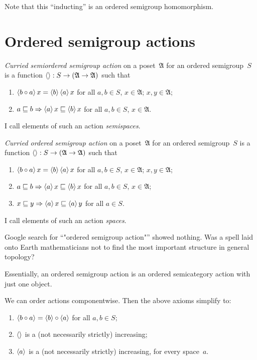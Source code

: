 Note that this ``inducting'' is an ordered semigroup homomorphism.

\chapter{Ordered semigroup actions}

\begin{defn}
\emph{Curried semiordered semigroup action} on a poset~$\mathfrak{A}$ for an ordered semigroup~$S$ is a function $\left\langle \right\rangle:S\to(\mathfrak{A}\to\mathfrak{A})$ such that
\begin{enumerate}
\item $\left\langle b\circ a\right\rangle x = \left\langle b\right\rangle\left\langle a\right\rangle x$ for all $a,b\in S$, $x\in\mathfrak{A}$;
$x,y\in\mathfrak{A}$;
\item $a\sqsubseteq b\Rightarrow\left\langle a\right\rangle x\sqsubseteq \left\langle b\right\rangle x$ for all $a,b\in S$, $x\in\mathfrak{A}$.
\end{enumerate}
I call elements of such an action \emph{semispaces}.
\end{defn}

\begin{defn}
\emph{Curried ordered semigroup action} on a poset~$\mathfrak{A}$ for an ordered semigroup~$S$ is a function $\left\langle \right\rangle:S\to(\mathfrak{A}\to\mathfrak{A})$ such that
\begin{enumerate}
\item $\left\langle b\circ a\right\rangle x = \left\langle b\right\rangle\left\langle a\right\rangle x$ for all $a,b\in S$, $x\in\mathfrak{A}$;
$x,y\in\mathfrak{A}$;
\item $a\sqsubseteq b\Rightarrow\left\langle a\right\rangle x\sqsubseteq \left\langle b\right\rangle x$ for all $a,b\in S$, $x\in\mathfrak{A}$;
\item $x\sqsubseteq y\Rightarrow\left\langle a\right\rangle x\sqsubseteq \left\langle a\right\rangle y$ for all $a\in S$.
\end{enumerate}
I call elements of such an action \emph{spaces}.
\end{defn}

\begin{rem}
Google search for ``"ordered semigroup action"'' showed nothing. Was a spell laid onto Earth mathematicians not to find the most important structure in general topology?
\end{rem}

Essentially, an ordered semigroup action is an ordered semicategory action with just one object.

We can order actions componentwise. Then the above axioms simplify to:
\begin{enumerate}
\item $\left\langle b\circ a\right\rangle = \left\langle b\right\rangle\circ\left\langle a\right\rangle$ for all $a,b\in S$;
\item $\left\langle \right\rangle$ is a (not necessarily strictly) increasing;
\item $\left\langle a\right\rangle$ is a (not necessarily strictly) increasing, for every space~$a$.
\end{enumerate}

